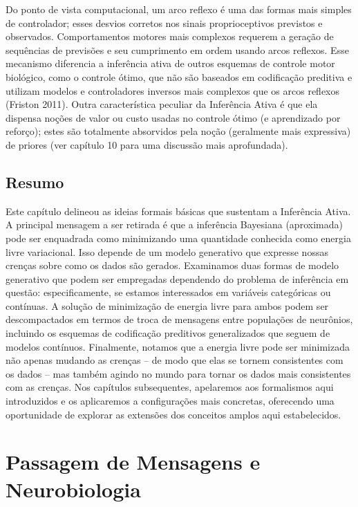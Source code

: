 \documentclass[
  12pt,
]{book}
\begin{document}
Do ponto de vista computacional, um arco reflexo é uma das formas mais simples de controlador; esses desvios corretos nos sinais proprioceptivos previstos e observados. Comportamentos motores mais complexos requerem a geração de sequências de previsões e seu cumprimento em ordem usando arcos reflexos. Esse mecanismo diferencia a inferência ativa de outros esquemas de controle motor biológico, como o controle ótimo, que não são baseados em codificação preditiva e utilizam modelos e controladores inversos mais complexos que os arcos reflexos (Friston 2011). Outra característica peculiar da Inferência Ativa é que ela dispensa noções de valor ou custo usadas no controle ótimo (e aprendizado por reforço); estes são totalmente absorvidos pela noção (geralmente mais expressiva) de priores (ver capítulo 10 para uma discussão mais aprofundada).

\hypertarget{resumo-3}{%
\section{Resumo}\label{resumo-3}}

Este capítulo delineou as ideias formais básicas que sustentam a Inferência Ativa. A principal mensagem a ser retirada é que a inferência Bayesiana (aproximada) pode ser enquadrada como minimizando uma quantidade conhecida como energia livre variacional. Isso depende de um modelo generativo que expresse nossas crenças sobre como os dados são gerados. Examinamos duas formas de modelo generativo que podem ser empregadas dependendo do problema de inferência em questão: especificamente, se estamos interessados em variáveis categóricas ou contínuas. A solução de minimização de energia livre para ambos podem ser descompactados em termos de troca de mensagens entre populações de neurônios, incluindo os esquemas de codificação preditivos generalizados que seguem de modelos contínuos. Finalmente, notamos que a energia livre pode ser minimizada não apenas mudando as crenças -- de modo que elas se tornem consistentes com os dados -- mas também agindo no mundo para tornar os dados mais consistentes com as crenças. Nos capítulos subsequentes, apelaremos aos formalismos aqui introduzidos e os aplicaremos a configurações mais concretas, oferecendo uma oportunidade de explorar as extensões dos conceitos amplos aqui estabelecidos.

\hypertarget{passagem-de-mensagens-e-neurobiologia}{%
\chapter{Passagem de Mensagens e Neurobiologia}\label{passagem-de-mensagens-e-neurobiologia}}
\end{document}
